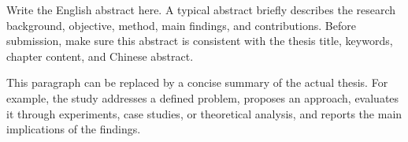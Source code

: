 Write the English abstract here. A typical abstract briefly describes the research background, objective, method, main findings, and contributions. Before submission, make sure this abstract is consistent with the thesis title, keywords, chapter content, and Chinese abstract.

This paragraph can be replaced by a concise summary of the actual thesis. For example, the study addresses a defined problem, proposes an approach, evaluates it through experiments, case studies, or theoretical analysis, and reports the main implications of the findings.
